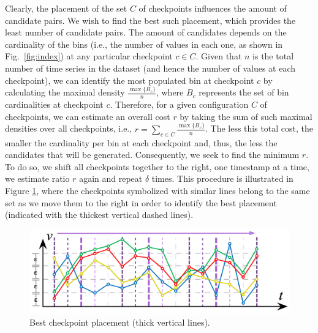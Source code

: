 Clearly, the placement of the set $C$ of checkpoints influences the amount of candidate pairs. We wish to find the best such placement, which provides the least number of candidate pairs. The amount of candidates depends on the cardinality of the bins (i.e., the number of values in each one, as shown in Fig.~\ref{fig:index}) at any particular checkpoint $c \in C$. Given that $n$ is the total number of time series in the dataset (and hence the number of values at each checkpoint), we can identify the most populated bin at checkpoint $c$ by calculating the maximal density $\frac{\max\{B_{c}\}}{n}$, where $B_{c}$ represents the set of bin cardinalities at checkpoint $c$. Therefore, for a given configuration $C$ of checkpoints, we can estimate an overall cost $r$ by taking the sum of such maximal densities over all checkpoints, i.e.,  $r=\sum_{c \in C}{\frac{\max\{B_{c}\}}{n}}$. The less this total cost, the smaller the cardinality per bin at each checkpoint and, thus, the less the candidates that will be generated. Consequently, we seek to find the minimum $r$. To do so, we shift all checkpoints together to the right, one timestamp at a time, we estimate ratio $r$ again and repeat $\delta$ times. This procedure is illustrated in Figure \ref{fig:heuristic1}, where the checkpoints symbolized with similar lines belong to the same set as we move them to the right in order to identify the best placement (indicated with the thickest vertical dashed lines).

\begin{figure}[tb]
    \centering
    \includegraphics{figures/heuristic.png}
    \caption{Best checkpoint placement (thick vertical lines).}
    \label{fig:heuristic1}
\end{figure}


